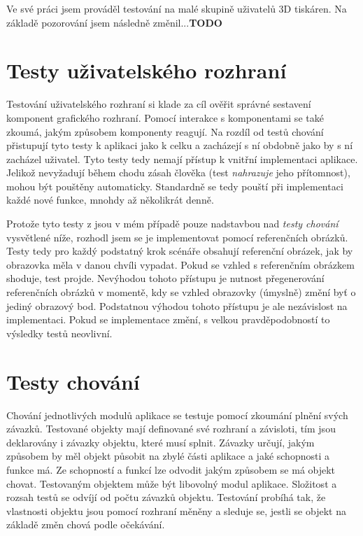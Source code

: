 Ve své práci jsem prováděl testování na malé skupině uživatelů 3D tiskáren.
Na základě pozorování jsem následně změnil...\textbf{TODO}

\section{Testy uživatelského rozhraní}\label{testovani-ui}

Testování uživatelského rozhraní si klade za cíl ověřit správné sestavení komponent grafického rozhraní.
Pomocí interakce s komponentami se také zkoumá, jakým způsobem komponenty reagují.
Na rozdíl od testů chování přistupují tyto testy k aplikaci jako k celku a zacházejí s ní obdobně jako by s ní zacházel uživatel. Tyto testy tedy nemají přístup k vnitřní implementaci aplikace.
Jelikož nevyžadují během chodu zásah člověka (test \textit{nahrazuje} jeho přítomnost), mohou být pouštěny automaticky.
Standardně se tedy pouští při implementaci každé nové funkce, mnohdy až několikrát denně. \cite{apple-ui-testing}

Protože tyto testy z jsou v mém případě pouze nadstavbou nad \textit{testy chování} vysvětlené níže, rozhodl jsem se je implementovat pomocí referenčních obrázků.
Testy tedy pro každý podstatný krok scénáře obsahují referenční obrázek, jak by obrazovka měla v danou chvíli vypadat.
Pokud se vzhled s referenčním obrázkem shoduje, test projde.
Nevýhodou tohoto přístupu je nutnost přegenerování referenčních obrázků v momentě, kdy se vzhled obrazovky (úmyslně) změní byť o jediný obrazový bod.
Podstatnou výhodou tohoto přístupu je ale nezávislost na implementaci.
Pokud se implementace změní, s velkou pravděpodobností to výsledky testů neovlivní.

\section{Testy chování}\label{testovani-bdd}

Chování jednotlivých modulů aplikace se testuje pomocí zkoumání plnění svých závazků.
Testované objekty mají definované své rozhraní a závisloti, tím jsou deklarovány i závazky objektu, které musí splnit.
Závazky určují, jakým způsobem by měl objekt působit na zbylé části aplikace a jaké schopnosti a funkce má.
Ze schopností a funkcí lze odvodit jakým způsobem se má objekt chovat.
Testovaným objektem může být libovolný modul aplikace.
Složitost a rozsah testů se odvíjí od počtu závazků objektu.
Testování probíhá tak, že vlastnosti objektu jsou pomocí rozhraní měněny a sleduje se, jestli se objekt na základě změn chová podle očekávání. \cite{objcio-bdd}


